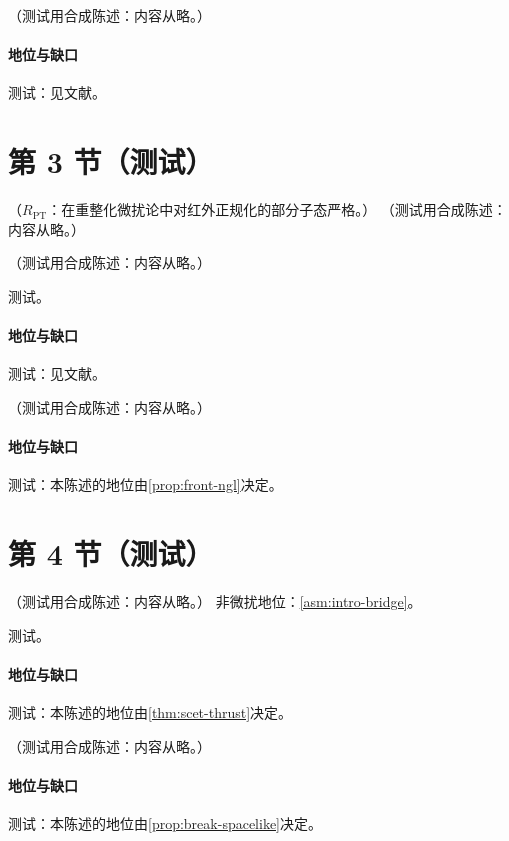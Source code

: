 \begin{conjecture}\label{conj:jets-hadronization}
（测试用合成陈述：内容从略。）
\end{conjecture}
\paragraph{地位与缺口}测试：见文献。

\section{第 3 节（测试）}\label{sec:jets-ngl}

\begin{proposition}\label{prop:jets-ngl}
（$R_{\mathrm{PT}}$：在重整化微扰论中对红外正规化的部分子态严格。）
（测试用合成陈述：内容从略。）
\end{proposition}

\begin{theorem}\label{thm:jets-bms}
（测试用合成陈述：内容从略。）
\end{theorem}
\begin{proofsketch}测试。\end{proofsketch}
\paragraph{地位与缺口}测试：见文献。

\begin{proposition}\label{prop:jets-ngl-beyond}
（测试用合成陈述：内容从略。）
\end{proposition}
\paragraph{地位与缺口}测试：本陈述的地位由\cref{prop:front-ngl}决定。

\section{第 4 节（测试）}\label{sec:jets-sll}

\begin{theorem}\label{thm:jets-ngl-factorization}
（测试用合成陈述：内容从略。）
非微扰地位：\cref{asm:intro-bridge}。
\end{theorem}
\begin{proofsketch}测试。\end{proofsketch}
\paragraph{地位与缺口}测试：本陈述的地位由\cref{thm:scet-thrust}决定。

\begin{proposition}\label{prop:jets-sll}
（测试用合成陈述：内容从略。）
\end{proposition}
\paragraph{地位与缺口}测试：本陈述的地位由\cref{prop:break-spacelike}决定。
